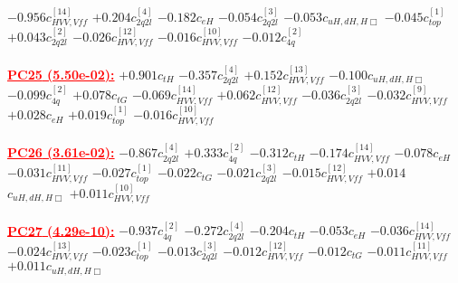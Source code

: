 \documentclass{article}
\begin{document}
{$-0.956$}{\rm $c_{HVV,Vff}^{[14]}$} 
{$+0.204$}{\rm $c_{2q2l}^{[4]}$} 
{$-0.182$}{\rm $c_{eH}$} 
{$-0.054$}{\rm $c_{2q2l}^{[3]}$} 
{$-0.053$}{\rm $c_{uH,dH,H\Box}$} 
{$-0.045$}{\rm $c_{top}^{[1]}$} 
{$+0.043$}{\rm $c_{2q2l}^{[2]}$} 
{$-0.026$}{\rm $c_{HVV,Vff}^{[12]}$} 
{$-0.016$}{\rm $c_{HVV,Vff}^{[10]}$} 
{$-0.012$}{\rm $c_{4q}^{[2]}$} 
 \nonumber \\ \nonumber \\ 
\noindent \textcolor{red}{\underline{\bf{PC25} (5.50e-02):}}
{$+0.901$}{\rm $c_{tH}$} 
{$-0.357$}{\rm $c_{2q2l}^{[4]}$} 
{$+0.152$}{\rm $c_{HVV,Vff}^{[13]}$} 
{$-0.100$}{\rm $c_{uH,dH,H\Box}$} 
{$-0.099$}{\rm $c_{4q}^{[2]}$} 
{$+0.078$}{\rm $c_{tG}$} 
{$-0.069$}{\rm $c_{HVV,Vff}^{[14]}$} 
{$+0.062$}{\rm $c_{HVV,Vff}^{[12]}$} 
{$-0.036$}{\rm $c_{2q2l}^{[3]}$} 
{$-0.032$}{\rm $c_{HVV,Vff}^{[9]}$} 
{$+0.028$}{\rm $c_{eH}$} 
{$+0.019$}{\rm $c_{top}^{[1]}$} 
{$-0.016$}{\rm $c_{HVV,Vff}^{[10]}$} 
 \nonumber \\ \nonumber \\ 
\noindent \textcolor{red}{\underline{\bf{PC26} (3.61e-02):}}
{$-0.867$}{\rm $c_{2q2l}^{[4]}$} 
{$+0.333$}{\rm $c_{4q}^{[2]}$} 
{$-0.312$}{\rm $c_{tH}$} 
{$-0.174$}{\rm $c_{HVV,Vff}^{[14]}$} 
{$-0.078$}{\rm $c_{eH}$} 
{$-0.031$}{\rm $c_{HVV,Vff}^{[11]}$} 
{$-0.027$}{\rm $c_{top}^{[1]}$} 
{$-0.022$}{\rm $c_{tG}$} 
{$-0.021$}{\rm $c_{2q2l}^{[3]}$} 
{$-0.015$}{\rm $c_{HVV,Vff}^{[12]}$} 
{$+0.014$}{\rm $c_{uH,dH,H\Box}$} 
{$+0.011$}{\rm $c_{HVV,Vff}^{[10]}$} 
 \nonumber \\ \nonumber \\ 
\noindent \textcolor{red}{\underline{\bf{PC27} (4.29e-10):}}
{$-0.937$}{\rm $c_{4q}^{[2]}$} 
{$-0.272$}{\rm $c_{2q2l}^{[4]}$} 
{$-0.204$}{\rm $c_{tH}$} 
{$-0.053$}{\rm $c_{eH}$} 
{$-0.036$}{\rm $c_{HVV,Vff}^{[14]}$} 
{$-0.024$}{\rm $c_{HVV,Vff}^{[13]}$} 
{$-0.023$}{\rm $c_{top}^{[1]}$} 
{$-0.013$}{\rm $c_{2q2l}^{[3]}$} 
{$-0.012$}{\rm $c_{HVV,Vff}^{[12]}$} 
{$-0.012$}{\rm $c_{tG}$} 
{$-0.011$}{\rm $c_{HVV,Vff}^{[11]}$} 
{$+0.011$}{\rm $c_{uH,dH,H\Box}$} 
 \nonumber \\ \nonumber \\ 
\end{document}
